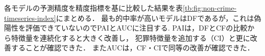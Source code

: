 



各モデルの予測精度を精度指標を基に比較した結果を表\ref{tb:fig:non-crime-timeseries-index}にまとめる．
最も的中率が高いモデルはDFであるが，これは偽陽性を評価できていないのでPAIとAUCに注目する.
PAIは，DFとCFの比較から特徴量を連続化すると大きく改善し，
犯罪特徴量を追加する（CI）と更に改善することが確認できた．
またAUCは，CF・CIで同等の改善が確認できた．

